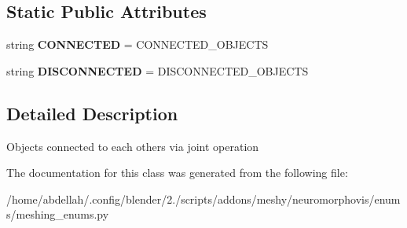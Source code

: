\subsection*{Static Public Attributes}
\begin{DoxyCompactItemize}
\item 
string {\bfseries C\+O\+N\+N\+E\+C\+T\+ED} = \textquotesingle{}C\+O\+N\+N\+E\+C\+T\+E\+D\+\_\+\+O\+B\+J\+E\+C\+TS\textquotesingle{}\hypertarget{classmeshy_1_1neuromorphovis_1_1enums_1_1meshing__enums_1_1Meshing_1_1ObjectsConnection_a48de71529e34bf7a133902219ffc2133}{}\label{classmeshy_1_1neuromorphovis_1_1enums_1_1meshing__enums_1_1Meshing_1_1ObjectsConnection_a48de71529e34bf7a133902219ffc2133}

\item 
string {\bfseries D\+I\+S\+C\+O\+N\+N\+E\+C\+T\+ED} = \textquotesingle{}D\+I\+S\+C\+O\+N\+N\+E\+C\+T\+E\+D\+\_\+\+O\+B\+J\+E\+C\+TS\textquotesingle{}\hypertarget{classmeshy_1_1neuromorphovis_1_1enums_1_1meshing__enums_1_1Meshing_1_1ObjectsConnection_acd80baedd75470aa15649a360a372e1a}{}\label{classmeshy_1_1neuromorphovis_1_1enums_1_1meshing__enums_1_1Meshing_1_1ObjectsConnection_acd80baedd75470aa15649a360a372e1a}

\end{DoxyCompactItemize}


\subsection{Detailed Description}


\begin{DoxyVerb}Objects connected to each others via joint operation
\end{DoxyVerb}
 

The documentation for this class was generated from the following file\+:\begin{DoxyCompactItemize}
\item 
/home/abdellah/.\+config/blender/2./scripts/addons/meshy/neuromorphovis/enums/meshing\+\_\+enums.\+py\end{DoxyCompactItemize}
